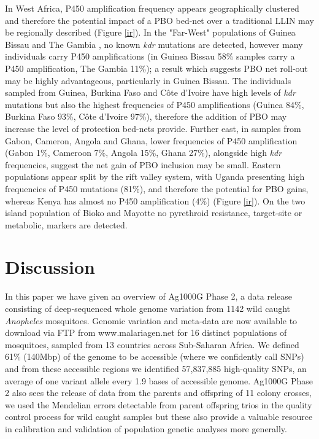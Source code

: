 \documentclass[a4paper,11pt,abstracton,hidelinks]{scrartcl}
\begin{document}
In West Africa, P450 amplification frequency appears geographically clustered and therefore the potential impact of a PBO bed-net over a traditional LLIN may be regionally described (Figure \ref{ir}).
%
In the "Far-West" populations of Guinea Bissau and The Gambia \cite{caputo2011}, no known \textit{kdr} mutations are detected, however many individuals carry P450 amplifications (in Guinea Bissau 58\% samples carry a P450 amplification, The Gambia 11\%); 
%
a result which suggests PBO net roll-out may be highly advantageous, particularly in Guinea Bissau.
%
The individuals sampled from Guinea, Burkina Faso and C\^{o}te d'Ivoire have high levels of \textit{kdr} mutations but also the highest frequencies of P450 amplifications (Guinea 84\%, Burkina Faso 93\%, C\^{o}te d'Ivoire 97\%), therefore the addition of PBO may increase the level of protection bed-nets provide.
%
Further east, in samples from Gabon, Cameron, Angola and Ghana, lower frequencies of P450 amplification (Gabon 1\%, Cameroon 7\%, Angola 15\%, Ghana 27\%), alongside high \textit{kdr} frequencies, suggest the net gain of PBO inclusion may be small.
%
Eastern populations appear split by the rift valley system, with Uganda presenting high frequencies of P450 mutations (81\%), and therefore the potential for PBO gains, whereas Kenya has almost no P450 amplification (4\%) (Figure \ref{ir}).
%
On the two island population of Bioko and Mayotte no pyrethroid resistance, target-site or metabolic, markers are detected.



\section*{Discussion}


In this paper we have given an overview of Ag1000G Phase 2, a data release consisting of deep-sequenced whole genome variation from 1142 wild caught \emph{Anopheles} mosquitoes.
%
Genomic variation and meta-data are now available to download via FTP from www.malariagen.net for 16 distinct populations of mosquitoes, sampled from 13 countries across Sub-Saharan Africa. 
%
We defined 61\% (140Mbp) of the genome to be accessible (where we confidently call SNPs) and from these accessible regions we identified 57,837,885 high-quality SNPs, an average of one variant allele every 1.9 bases of accessible genome.
%
Ag1000G Phase 2 also sees the release of data from the parents and offspring of 11 colony crosses, we used the Mendelian errors detectable from parent offspring trios in the quality control process for wild caught samples but these also provide a valuable resource in calibration and validation of population genetic analyses more generally.
\end{document}
